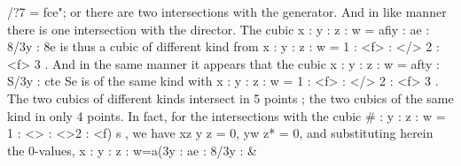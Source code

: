\documentclass[11pt,a4paper]{book}
\begin{document}
/?7 = fce"; or there are two intersections with the generator. And in like manner there is one intersection with the director. The cubic x : y : z : w = afiy : ae : 8/3y : 8e is thus a cubic of different kind from x : y : z : w = 1 : <f> : </> 2 : <f> 3 . And in the same manner it appears that the cubic x : y : z : w = afty : S/3y : cte Se is of the same kind with x : y : z : w = 1 : <f> : </> 2 : <f> 3 . The two cubics of different kinds intersect in 5 points ; the two cubics of the same kind in only 4 points. In fact, for the intersections with the cubic # : y : z : w = 1 : <> : <>2 : <f) s , we have xz y z = 0, yw z* = 0, and substituting herein the 0-values, x : y : z : w=a(3y : ae : 8/3y : &%
\end{document}
